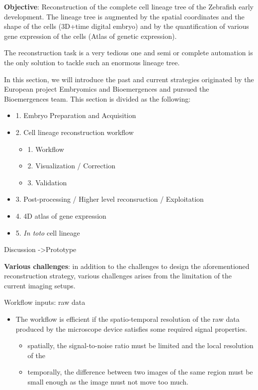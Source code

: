 \textbf{Objective}: Reconstruction of the complete cell lineage tree of the Zebrafish early development. The lineage tree is augmented by the spatial coordinates and the shape of the cells (3D+time digital embryo) and by the quantification of various gene expression of the cells (Atlas of genetic expression). 

  The reconstruction task is a very tedious one and semi or complete automation is the only solution to tackle such an enormous lineage tree. 

  In this section, we will introduce the past and current strategies originated by the European project Embryomics and Bioemergences and pursued the Bioemergences team. This section is divided as the following: 
\begin{itemize}
	\item 1. Embryo Preparation and Acquisition
	\item 2. Cell lineage reconstruction workflow
\begin{itemize}
	\item 1. Workflow
	\item 2. Visualization / Correction
	\item 3. Validation
\end{itemize}
	\item 3. Post-processing / Higher level reconsruction / Exploitation
	\item 4. 4D atlas of gene expression
	\item 5. \textit{In toto} cell lineage
\end{itemize}    Discussion ->Prototype   

\textbf{Various challenges}: in addition to the challenges to design the aforementioned reconstruction strategy, various challenges arises from the limitation of the current imaging setups.  

  Workflow inputs: raw data 
\begin{itemize}
	\item The workflow is efficient if the spatio-temporal resolution of the raw data produced by the microscope device satisfies some required signal properties.
\begin{itemize}
	\item spatially, the signal-to-noise ratio must be limited and the local resolution of the    
	\item temporally, the difference between two images of the same region must be small enough as the image must not move too much.
\end{itemize}
\end{itemize}

